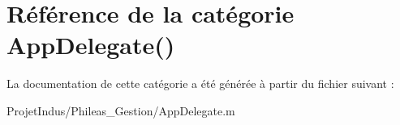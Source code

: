 \hypertarget{category_app_delegate_07_08}{}\section{Référence de la catégorie App\+Delegate()}
\label{category_app_delegate_07_08}


La documentation de cette catégorie a été générée à partir du fichier suivant \+:\begin{DoxyCompactItemize}
\item 
Projet\+Indus/\+Phileas\+\_\+\+Gestion/App\+Delegate.\+m\end{DoxyCompactItemize}

